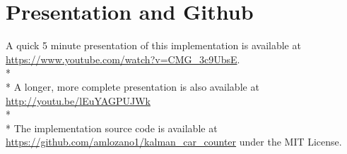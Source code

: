 \documentclass{article} %
\begin{document}
\section{Presentation and Github}
\label{sec:presentation}
A quick 5 minute presentation of this implementation is available at \url{https://www.youtube.com/watch?v=CMG_3c9UbsE}.
\\*\\*
A longer, more complete presentation is also available at \url{http://youtu.be/lEuYAGPUJWk}
\\*\\*
The implementation source code is available at \url{https://github.com/amlozano1/kalman_car_counter} under the MIT License. 

\nocite{*}


\end{document}
